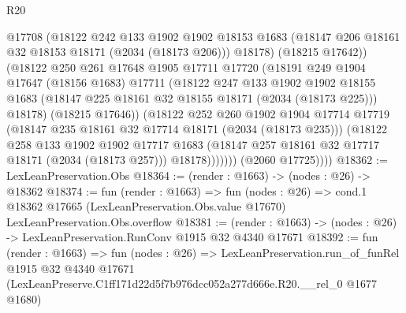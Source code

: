 \begin{lexlean}{R20}
\begin{coremodule}
                    @17708
                    (@18122
                      @242
                      @133
                      @1902
                      @1902
                      @18153
                      @1683
                      (@18147 @206 @18161 @32 @18153 @18171 (@2034 (@18173 @206)))
                      @18178)
                    (@18215 @17642))
                  (@18122
                    @250
                    @261
                    @17648
                    @1905
                    @17711
                    @17720
                    (@18191
                      @249
                      @1904
                      @17647
                      (@18156 @1683)
                      @17711
                      (@18122
                        @247
                        @133
                        @1902
                        @1902
                        @18155
                        @1683
                        (@18147 @225 @18161 @32 @18155 @18171 (@2034 (@18173 @225)))
                        @18178)
                      (@18215 @17646))
                    (@18122
                      @252
                      @260
                      @1902
                      @1904
                      @17714
                      @17719
                      (@18147 @235 @18161 @32 @17714 @18171 (@2034 (@18173 @235)))
                      (@18122
                        @258
                        @133
                        @1902
                        @1902
                        @17717
                        @1683
                        (@18147 @257 @18161 @32 @17717 @18171 (@2034 (@18173 @257)))
                        @18178)))))))
          (@2060 @17725))))
@18362 := LexLeanPreservation.Obs
@18364 := (render : @1663) -> (nodes : @26) -> @18362
@18374 := fun (render : @1663) =>
  fun (nodes : @26) =>
  cond.{1} @18362 @17665 (LexLeanPreservation.Obs.value @17670) LexLeanPreservation.Obs.overflow
@18381 := (render : @1663) -> (nodes : @26) -> LexLeanPreservation.RunConv @1915 @32 @4340 @17671
@18392 := fun (render : @1663) =>
  fun (nodes : @26) =>
  LexLeanPreservation.run_of_funRel
    @1915
    @32
    @4340
    @17671
    (LexLeanPreserve.C1ff171d22d5f7b976dcc052a277d666e.R20.__rel_0 @1677 @1680)
\end{coremodule}
\end{lexlean}
